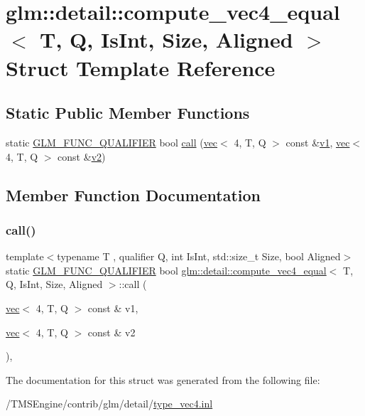 \hypertarget{structglm_1_1detail_1_1compute__vec4__equal}{}\section{glm\+:\+:detail\+:\+:compute\+\_\+vec4\+\_\+equal$<$ T, Q, Is\+Int, Size, Aligned $>$ Struct Template Reference}
\label{structglm_1_1detail_1_1compute__vec4__equal}
\subsection*{Static Public Member Functions}
\begin{DoxyCompactItemize}
\item 
static \hyperlink{setup_8hpp_a33fdea6f91c5f834105f7415e2a64407}{G\+L\+M\+\_\+\+F\+U\+N\+C\+\_\+\+Q\+U\+A\+L\+I\+F\+I\+ER} bool \hyperlink{structglm_1_1detail_1_1compute__vec4__equal_a5b7d0b1229e2c3d669e6937cf4977aa4}{call} (\hyperlink{structglm_1_1vec}{vec}$<$ 4, T, Q $>$ const \&\hyperlink{_s_d_l__opengl__glext_8h_a435c176a02c061b43e19bdf7c86cceae}{v1}, \hyperlink{structglm_1_1vec}{vec}$<$ 4, T, Q $>$ const \&\hyperlink{_s_d_l__opengl__glext_8h_a0928f6d0f0f794ba000a21dfae422136}{v2})
\end{DoxyCompactItemize}


\subsection{Member Function Documentation}
\mbox{\label{structglm_1_1detail_1_1compute__vec4__equal_a5b7d0b1229e2c3d669e6937cf4977aa4}} 
\subsubsection{\texorpdfstring{call()}{call()}}
{\footnotesize\ttfamily template$<$typename T , qualifier Q, int Is\+Int, std\+::size\+\_\+t Size, bool Aligned$>$ \\
static \hyperlink{setup_8hpp_a33fdea6f91c5f834105f7415e2a64407}{G\+L\+M\+\_\+\+F\+U\+N\+C\+\_\+\+Q\+U\+A\+L\+I\+F\+I\+ER} bool \hyperlink{structglm_1_1detail_1_1compute__vec4__equal}{glm\+::detail\+::compute\+\_\+vec4\+\_\+equal}$<$ T, Q, Is\+Int, Size, Aligned $>$\+::call (\begin{DoxyParamCaption}\item[{\hyperlink{structglm_1_1vec}{vec}$<$ 4, T, Q $>$ const \&}]{v1,  }\item[{\hyperlink{structglm_1_1vec}{vec}$<$ 4, T, Q $>$ const \&}]{v2 }\end{DoxyParamCaption})\hspace{0.3cm}{\ttfamily [inline]}, {\ttfamily [static]}}



The documentation for this struct was generated from the following file\+:\begin{DoxyCompactItemize}
\item 
/\+T\+M\+S\+Engine/contrib/glm/detail/\hyperlink{type__vec4_8inl}{type\+\_\+vec4.\+inl}\end{DoxyCompactItemize}
